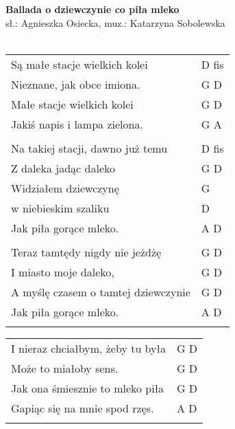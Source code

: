 \documentclass[a5paper]{article}
\begin{document}


\noindent
\fontsize{12pt}{15pt}\selectfont
\textbf{Ballada o dziewczynie co piła mleko} \\
\fontsize{8pt}{10pt}\selectfont
sł.: Agnieszka Osiecka, muz.: Katarzyna Sobolewska\\ \\
\fontsize{10pt}{12pt}\selectfont
{}
\begin{tabular}{@{}p{8.5cm}p{3cm}@{}}
\noindent
Są małe stacje wielkich kolei & D fis \\
Nieznane, jak obce imiona. & G D \\
Małe stacje wielkich kolei & G D \\
Jakiś napis i lampa zielona. & G A \\ \\

Na takiej stacji, dawno już temu & D fis \\
Z daleka jadąc daleko & G D \\
Widziałem dziewczynę & G \\
w niebieskim szaliku & D \\
Jak piła gorące mleko. & A D \\ \\

Teraz tamtędy nigdy nie jeżdżę & G D \\
I miasto moje daleko, & G D \\
A myślę czasem o tamtej dziewczynie & G D \\
Jak piła gorące mleko. & A D \\ \\
\end{tabular}

\noindent
\begin{tabular}{@{}p{7.5cm}p{3cm}@{}}
I nieraz chciałbym, żeby tu była & G D \\
Może to miałoby sens. & G D \\
Jak ona śmiesznie to mleko piła & G D \\
Gapiąc się na mnie spod rzęs. & A D \\ \\
\end{tabular}
\end{document}
